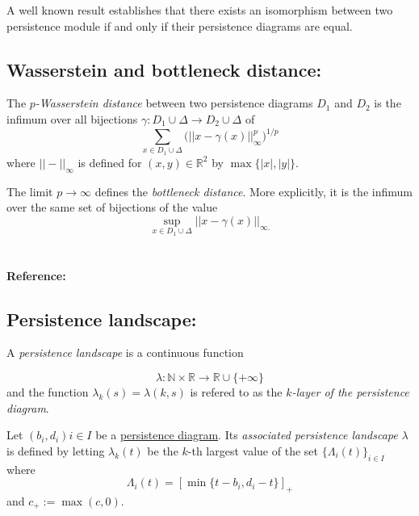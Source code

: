 \documentclass{amsart}
\begin{document}
	A well known result establishes that there exists an isomorphism between two persistence module if and only if their persistence diagrams are equal.
	
	\subsection*{Wasserstein and bottleneck distance:}	\label{wasserstein and bottleneck distance}
	
	The \textit{$p$-Wasserstein distance} between two persistence diagrams $D_1$ and $D_2$ is the infimum over all bijections $\gamma: D_1 \cup \Delta \to D_2 \cup \Delta$ of
	\begin{equation*}
	\sum_{x \in D_1 \cup \Delta} \Big(||x - \gamma(x)||_\infty^p \Big)^{1/p}
	\end{equation*}
	where $||-||_\infty$ is defined for $(x,y) \in \mathbb R^2$ by $\max\{|x|, |y|\}$. 
	
	The limit $p \to \infty$ defines the \textit{bottleneck distance}. More explicitly, it is the infimum over the same set of bijections of the value
	\begin{equation*}
	\sup_{x \in D_1 \cup \Delta} ||x - \gamma(x)||_{\infty.}
	\end{equation*}
	
	\paragraph{\\ Reference:} \cite{kerber2017geometry}
	
	\subsection*{Persistence landscape:} \label{persistence landscape}
	
	A \textit{persistence landscape} is a continuous function
	
	\begin{equation*}
	\lambda : \mathbb N \times \mathbb R \to \mathbb R \cup \{+\infty\}
	\end{equation*}
	and the function $\lambda_k(s) = \lambda(k,s)$ is refered to as the \textit{$k$-layer of the persistence diagram}.
	
	Let ${(b_i, d_i)}{i \in I}$ be a \hyperref[persistence diagram] {persistence diagram}. Its \textit{associated persistence landscape} $\lambda$ is defined by letting $\lambda_k(t)$ be the $k$-th largest value of the set $\{\Lambda_i(t)\}_ {i \in I}$ where
	\begin{equation*}
	\Lambda_i(t) = \left[ \min \{t-b_i, d_i-t\}\right]_+
	\end{equation*}
	and $c_+ := \max(c,0)$.
	
\end{document}
